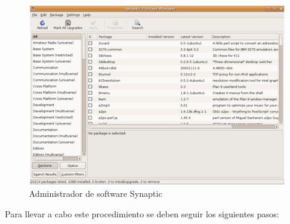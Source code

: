 \begin{figure}
\centering
	\includegraphics[scale=0.7]{figs/synaptic}
	\vspace{0.1in}
	\caption{Administrador de software Synaptic}
	\label{fig:synaptic}
\end{figure}

Para llevar a cabo este procedimiento se deben seguir los siguientes pasos:


